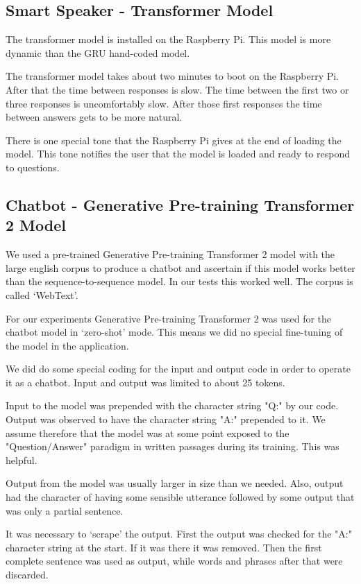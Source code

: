\subsection{Smart Speaker - Transformer Model}

The transformer model is installed on the Raspberry Pi. This model is more dynamic than the GRU hand-coded model. 

The transformer model takes about two minutes to boot on the Raspberry Pi. After that the time between responses is slow. The time between the first two or three responses is uncomfortably slow. After those first responses the time between answers gets to be more natural.

There is one special tone that the Raspberry Pi gives at the end of loading the model. This tone notifies the user that the model is loaded and ready to respond to questions.

\subsection{Chatbot - Generative Pre-training Transformer 2 Model}
We used a pre-trained Generative Pre-training Transformer 2 model with the large english corpus to produce a chatbot and ascertain if this model works better than the sequence-to-sequence model. In our tests this worked well. The corpus is called `WebText'.

For our experiments Generative Pre-training Transformer 2 was used for the chatbot model in `zero-shot' mode. This means we did no special fine-tuning of the model in the application.

We did do some special coding for the input and output code in order to operate it as a chatbot. Input and output was limited to about 25 tokens. 

Input to the model was prepended with the character string "Q:" by our code. Output was observed to have the character string "A:" prepended to it. We assume therefore that the model was at some point exposed to the "Question/Answer" paradigm in written passages during its training. This was helpful.

Output from the model was usually larger in size than we needed. Also, output had the character of having some sensible utterance followed by some output that was only a partial sentence.

It was necessary to `scrape' the output. First the output was checked for the "A:" character string at the start. If it was there it was removed. Then the first complete sentence was used as output, while words and phrases after that were discarded.

